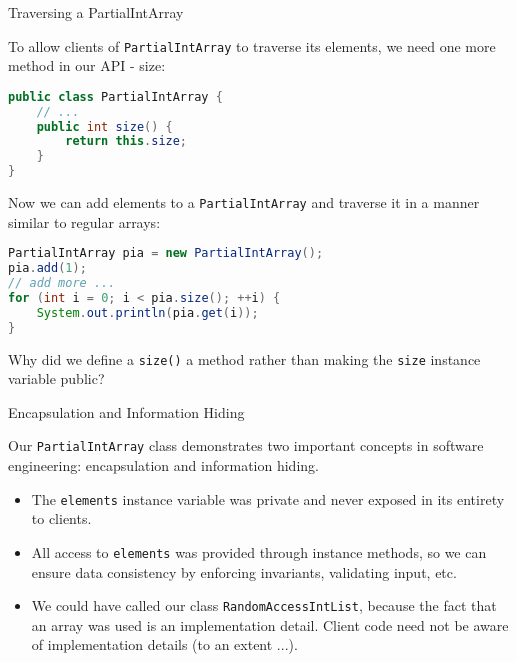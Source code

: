 \documentclass{beamer}
\begin{document}
\begin{frame}[fragile]{Traversing a PartialIntArray}


To allow clients of {\tt PartialIntArray} to traverse its elements, we need one more method in our API - size:
\begin{lstlisting}[language=Java]
public class PartialIntArray {
    // ...
    public int size() {
        return this.size;
    }
}
\end{lstlisting}
Now we can add elements to a {\tt PartialIntArray} and traverse it in a manner similar to regular arrays:
\vspace{-.05in}
\begin{lstlisting}[language=Java]
PartialIntArray pia = new PartialIntArray();
pia.add(1);
// add more ...
for (int i = 0; i < pia.size(); ++i) {
    System.out.println(pia.get(i));
}
\end{lstlisting}
\vspace{-.05in}
Why did we define a {\tt size()} a method rather than making the {\tt size} instance variable public?

\end{frame}

\begin{frame}[fragile]{Encapsulation and Information Hiding}


Our {\tt PartialIntArray} class demonstrates two important concepts in software engineering: encapsulation and information hiding.

\begin{itemize}
\item The {\tt elements} instance variable was private and never exposed in its entirety to clients.
\item All access to {\tt elements} was provided through instance methods, so we can ensure data consistency by enforcing invariants, validating input, etc.
\item We could have called our class {\tt RandomAccessIntList}, because the fact that an array was used is an implementation detail.  Client code need not be aware of implementation details (to an extent ...).
\end{itemize}


\end{frame}
\end{document}
